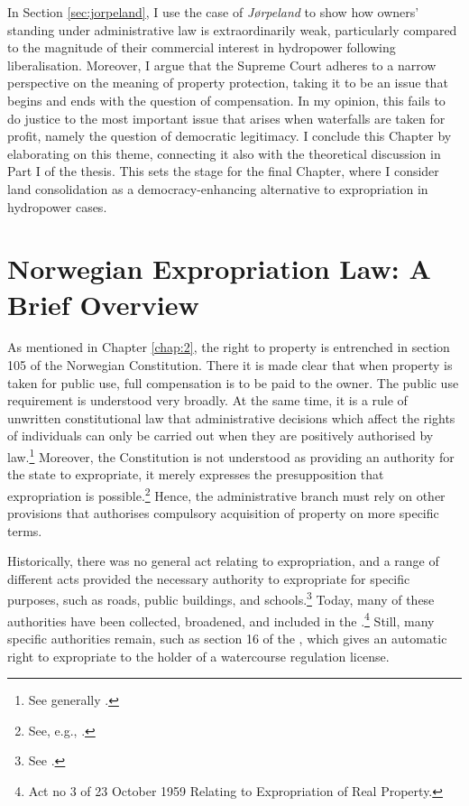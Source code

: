 In Section \ref{sec:jorpeland}, I use the case of {\it Jørpeland} to show how owners' standing under administrative law is extraordinarily weak, particularly compared to the magnitude of their commercial interest in hydropower following liberalisation. Moreover, I argue that the Supreme Court adheres to a narrow perspective on the meaning of property protection, taking it to be an issue that begins and ends with the question of compensation. In my opinion, this fails to do justice to the most important issue that arises when waterfalls are taken for profit, namely the question of democratic legitimacy. I conclude this Chapter by elaborating on this theme, connecting it also with the theoretical discussion in Part I of the thesis. This sets the stage for the final Chapter, where I consider land consolidation as a democracy-enhancing alternative to expropriation in hydropower cases.


\section{Norwegian Expropriation Law: A Brief Overview}\label{sec:explaw}

As mentioned in Chapter \ref{chap:2}, the right to property is entrenched in section 105 of the Norwegian Constitution. There it is made clear that when property is taken for public use, full compensation is to be paid to the owner. The public use requirement is understood very broadly. At the same time, it is a rule of unwritten constitutional law that administrative decisions which affect the rights of individuals can only be carried out when they are positively authorised by law.\footnote{See generally \cite{hogberg11}.} Moreover, the Constitution is not understood as providing an authority for the state to expropriate, it merely expresses the presupposition that expropriation is possible.\footnote{See, e.g., \cite[6]{fleischer86}.} Hence, the administrative branch must rely on other provisions that authorises compulsory acquisition of property on more specific terms.

Historically, there was no general act relating to expropriation, and a range of different acts provided the necessary authority to expropriate for specific purposes, such as roads, public buildings, and schools.\footnote{See \cite[11-12]{nut54}.} Today, many of these authorities have been collected, broadened, and included in the \cite{ea59}.\footnote{Act no 3 of 23 October 1959 Relating to Expropriation of Real Property.} Still, many specific authorities remain, such as section 16 of the \cite{wra17}, which gives an automatic right to expropriate to the holder of a watercourse regulation license.

